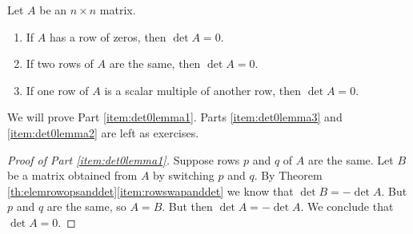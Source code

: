 \documentclass{ximera}
\begin{document}
\begin{lemma}\label{lemma:det0lemma}
Let $A$ be an $n\times n$ matrix.  
\begin{enumerate}
\item \label{item:det0lemma3} If $A$ has a row of zeros, then $\det{A}=0$.
\item \label{item:det0lemma1} If two rows of $A$ are the same, then $\det{A}=0$.
\item \label{item:det0lemma2} If one row of $A$ is a scalar multiple of another row, then $\det{A}=0$.
\end{enumerate}
\end{lemma}
We will prove Part \ref{item:det0lemma1}.  Parts  \ref{item:det0lemma3} and \ref{item:det0lemma2} are left as exercises.
\begin{proof}[Proof of Part \ref{item:det0lemma1}]
Suppose rows $p$ and $q$ of $A$ are the same.  Let $B$ be a matrix obtained from $A$ by switching $p$ and $q$.  By Theorem \ref{th:elemrowopsanddet}\ref{item:rowswapanddet} we know that $\det{B}=-\det{A}$. But $p$ and $q$ are the same, so $A=B$.  But then
$\det{A}=-\det{A}$.
We conclude that $\det{A}=0$.
\end{proof}
\end{document}
